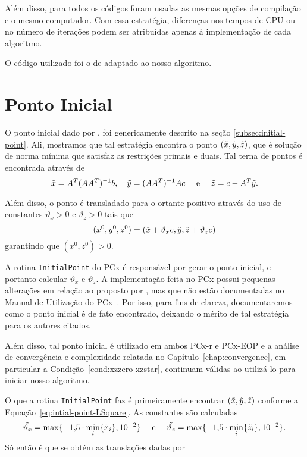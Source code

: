 Além disso, para todos os códigos foram usadas as mesmas opções de compilação e o mesmo computador. Com essa estratégia, diferenças nos tempos de CPU ou no número de iterações podem ser atribuídas apenas à implementação de cada algoritmo. 

O código utilizado foi o de \textcite{VillasBoas:2012ur,VillasBoas2013:wn} adaptado ao nosso algoritmo. 




\section{Ponto Inicial}

O ponto inicial dado por \textcite{Mehrotra:1992wr}, foi genericamente descrito na seção \ref{subsec:initial-point}. Ali, mostramos que tal estratégia encontra o ponto $(\tilde{x},\tilde{y},\tilde{z})$, que é solução de norma mínima que satisfaz as restrições primais e
duais. Tal terna de pontos é encontrada através de
\begin{equation}
	\label{eq:intial-point-LSquare}
	\tilde{x} = A^T(AA^T)^{-1}b, \quad \tilde{y} = (AA^T)^{-1}Ac\quad \text{ e }
\quad \tilde{z} = c - A^T\tilde{y}.
\end{equation}

Além disso, o ponto é transladado para o ortante positivo 
através do uso de constantes  $\vartheta_x>0$ e $\vartheta_ z>0$ tais que  
\begin{equation}
	\label{eq:intial-point-generated}
(x^0,y^0,z^0) = (\tilde{x}+ \vartheta_x e,\tilde{y},\tilde{z}+\vartheta_z e)
\end{equation}
garantindo que $(x^0,z^0)>0$.


 A rotina \verb|InitialPoint| do PCx é responsável por gerar o ponto inicial, e portanto calcular  $\vartheta_x$ e $\vartheta_ z$. A implementação feita no PCx possui  pequenas alterações em relação ao proposto por \citeauthor{Mehrotra:1992wr}, mas que não  estão documentadas no Manual de Utilização do PCx~\cite{Czyzyk:1998vw}. Por isso, para fins de clareza, documentaremos como o ponto inicial é de fato encontrado, deixando o mérito de tal estratégia para os autores citados.

  Além disso, tal ponto inicial é utilizado em ambos PCx-r e PCx-EOP e a análise de convergência e complexidade relatada no Capítulo~\ref{chap:convergence}, em particular a Condição~\ref{cond:xzzero-xzstar}, continuam válidas ao utilizá-lo para iniciar nosso algoritmo.

O que a rotina  \verb|InitialPoint| faz é primeiramente encontrar  $(\tilde{x},\tilde{y},\tilde{z})$ conforme a Equação~\eqref{eq:intial-point-LSquare}. As constantes são calculadas
\begin{equation}
	\label{eq:initial-point-tilde-var}
\tilde{\vartheta_x} = \max\{\displaystyle\num{-1.5}\cdot\min_{i}\{\tilde{x}_{i}\},\num{e-2}\} \quad \text{ e }\quad  \tilde{\vartheta_z} = \max\{\displaystyle\num{-1.5}\cdot\min_{i}\{\tilde{z}_{i}\},\num{e-2}\}.
\end{equation}
Só então é que se obtém as translações dadas por 


